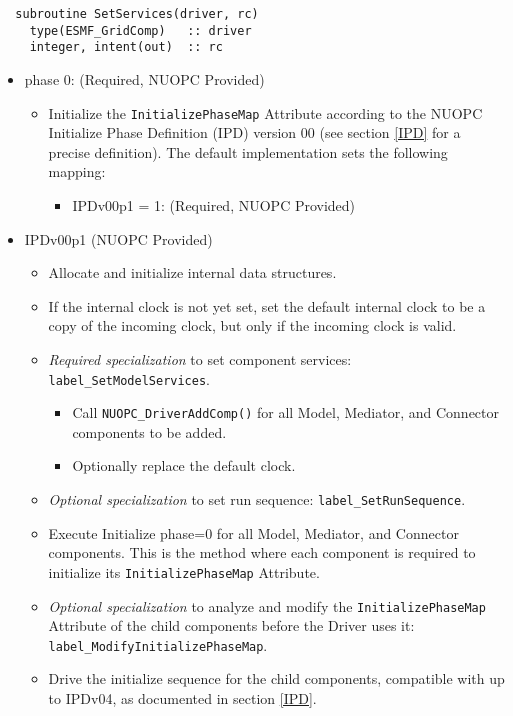 \begin{verbatim}  subroutine SetServices(driver, rc)
    type(ESMF_GridComp)   :: driver
    integer, intent(out)  :: rc
\end{verbatim}

\begin{itemize}
\item phase 0: ({\sc Required, NUOPC Provided})
  \begin{itemize}
  \item Initialize the {\tt InitializePhaseMap} Attribute according to the NUOPC Initialize Phase Definition (IPD) version 00 (see section \ref{IPD} for a precise definition). The default implementation sets the following mapping:
    \begin{itemize}
    \item IPDv00p1 = 1: ({\sc Required, NUOPC Provided})
    \end{itemize}  
  \end{itemize}  
\item IPDv00p1 ({\sc NUOPC Provided})
  \begin{itemize}
  \item Allocate and initialize internal data structures.
  \item If the internal clock is not yet set, set the default internal clock to be a copy of the incoming clock, but only if the incoming clock is valid.
  \item {\it Required specialization} to set component services: {\tt label\_SetModelServices}.
  \begin{itemize}
    \item Call {\tt NUOPC\_DriverAddComp()} for all Model, Mediator, and Connector components to be added.
    \item Optionally replace the default clock. 
  \end{itemize}
  \item {\it Optional specialization} to set run sequence: {\tt label\_SetRunSequence}.

  \item Execute Initialize phase=0 for all Model, Mediator, and Connector components. This is the method where each component is required to initialize its {\tt InitializePhaseMap} Attribute.
  \item {\it Optional specialization} to analyze and modify the {\tt InitializePhaseMap} Attribute of the child components before the Driver uses it: {\tt label\_ModifyInitializePhaseMap}.
  \item Drive the initialize sequence for the child components, compatible with up to IPDv04, as documented in section \ref{IPD}.
  \end{itemize}  
\end{itemize}


